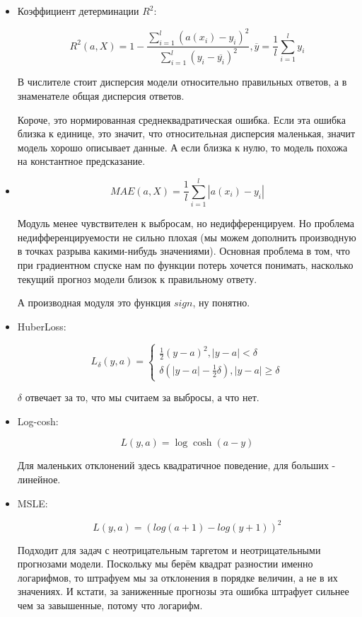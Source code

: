 \documentclass[a4paper]{article}
\begin{document}
\begin{itemize}
\begin{itemize}
\item Коэффициент детерминации $R^2$:

\[ R^2(a, X) = 1 - \frac{\sum_{i=1}^l (a(x_i) - y_i)^2}{\sum_{i=1}^l (y_i - \overline{y_i})^2}, \overline{y} = \frac{1}{l} \sum_{i=1}^l y_i \]

В числителе стоит дисперсия модели относительно правильных ответов, а в знаменателе общая дисперсия ответов.

Короче, это нормированная среднеквадратическая ошибка. Если эта ошибка близка к единице, это значит, что относительная дисперсия маленькая, значит модель хорошо описывает данные. А если близка к нулю, то модель похожа на константное предсказание.

\item \[ MAE(a, X) = \frac{1}{l} \sum_{i=1}^l |a(x_i) - y_i | \]

Модуль менее чувствителен к выбросам, но недифференцируем.
Но проблема недифференцируемости не сильно плохая (мы можем дополнить производную в точках разрыва какими-нибудь значениями). Основная проблема в том, что при градиентном спуске нам по функции потерь хочется понимать, насколько текущий прогноз модели близок к правильному ответу.

А производная модуля это функция $sign$, ну понятно.

\item HuberLoss:

\[ L_\delta(y, a) = \begin{cases}
\frac{1}{2} (y-a)^2, |y-a| < \delta \\
\delta \left( |y-a| - \frac{1}{2} \delta \right), |y-a| \geq \delta
\end{cases} \]

$\delta$ отвечает за то, что мы считаем за выбросы, а что нет.

\item Log-cosh:

\[ L(y, a) = \log \cosh (a-y) \]

Для маленьких отклонений здесь квадратичное поведение, для больших - линейное.

\item MSLE:

\[ L(y, a) = (log(a+1) - log(y+1))^2 \]

Подходит для задач с неотрицательным таргетом и неотрицательными прогнозами модели. Поскольку мы берём квадрат разностии именно логарифмов, то штрафуем мы за отклонения в порядке величин, а не в их значениях. И кстати, за заниженные прогнозы эта ошибка штрафует сильнее чем за завышенные, потому что логарифм.


\end{itemize}
\end{itemize}
\end{document}
